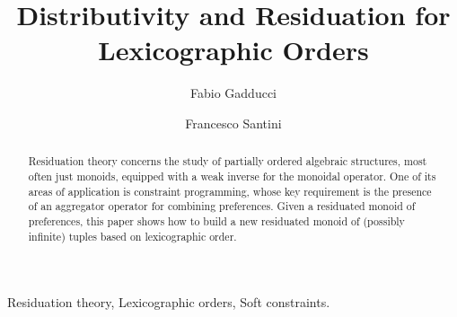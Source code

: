 \documentclass[a4paper]{elsarticle}
\newcommand{\1}{\mathbf{1}}
\begin{document}
\begin{frontmatter}





\title{Distributivity and Residuation for Lexicographic Orders}


		\author[pisa]{Fabio Gadducci}
		\author[perugia]{Francesco Santini}
		
		\address[pisa]{Dipartimento di Informatica, Universit{\`a} degli Studi di Pisa, Italy}	
		\address[perugia]{Dipartimento di Matematica e Informatica, Universit{\`a} degli Studi di Perugia, Italy}	



\begin{abstract} 
	Residuation theory concerns the study of partially ordered algebraic structures, most often just monoids,
	equipped with a weak inverse for the monoidal operator.
	One of its areas of application is constraint programming, whose 
	key requirement is the presence of an aggregator operator for combining preferences.
	Given a residuated monoid of preferences, this paper shows how to build a new residuated monoid 
	of (possibly infinite) tuples based on lexicographic order. 
\end{abstract}
        \begin{keyword}
        	Residuation theory, Lexicographic orders, Soft constraints. %
        \end{keyword}
    \end{frontmatter}
\end{document}
